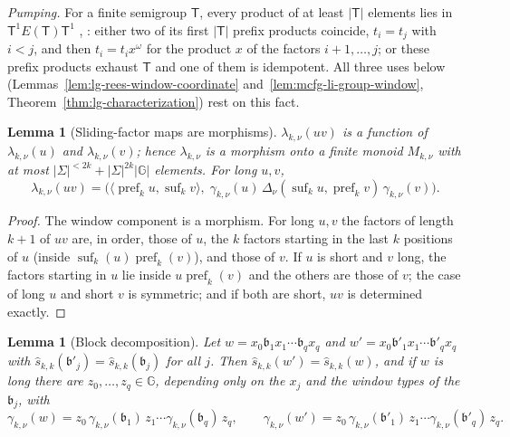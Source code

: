 \documentclass[11pt]{article}
\numberwithin{equation}{section}
\theoremstyle{plain}
\newtheorem{lemma}[theorem]{Lemma}
\theoremstyle{definition}
\theoremstyle{remark}
\theoremstyle{plain}
\begin{document}
\emph{Pumping.}  For a finite semigroup $\mathsf T$, every product of at least
$|\mathsf T|$ elements lies in $\mathsf T^1E(\mathsf T)\mathsf T^1$
\cite[Lemma~2.2]{AlmeidaEtAl2009}, \cite{Pin1986}: either two of its first
$|\mathsf T|$ prefix products coincide, $t_i=t_j$ with $i<j$, and then
$t_i=t_ix^\omega$ for the product $x$ of the factors $i+1,\ldots,j$; or these prefix
products exhaust $\mathsf T$ and one of them is idempotent.  All three uses below
(Lemmas~\ref{lem:lg-rees-window-coordinate} and~\ref{lem:mcfg-li-group-window},
Theorem~\ref{thm:lg-characterization}) rest on this fact.

\begin{lemma}[Sliding-factor maps are morphisms]
\label{lem:local-group-morphism}
$\lambda_{k,\nu}(uv)$ is a function of $\lambda_{k,\nu}(u)$ and $\lambda_{k,\nu}(v)$;
hence $\lambda_{k,\nu}$ is a morphism onto a finite monoid $M_{k,\nu}$ with at most
$|\Sigma|^{<2k}+|\Sigma|^{2k}|{\mathbb G}|$ elements.  For long $u,v$,
\[
 \lambda_{k,\nu}(uv)
 =\bigl(\langle\operatorname{pref}_ku,\operatorname{suf}_kv\rangle,\;
   \gamma_{k,\nu}(u)\,\Delta_\nu(\operatorname{suf}_ku,\operatorname{pref}_kv)\,
   \gamma_{k,\nu}(v)\bigr).
\]
\end{lemma}

\begin{proof}
The window component is a morphism.  For long $u,v$ the factors of length $k+1$
of $uv$ are, in order, those of $u$, the $k$ factors starting in the last $k$
positions of $u$ (inside $\operatorname{suf}_k(u)\operatorname{pref}_k(v)$), and
those of $v$.  If $u$ is short and $v$ long, the factors starting in $u$ lie inside
$u\operatorname{pref}_k(v)$ and the others are those of $v$; the case of long $u$ and
short $v$ is symmetric; and if both are short, $uv$ is determined exactly.
\end{proof}

\begin{lemma}[Block decomposition]
\label{lem:local-group-blocks}
Let $w=x_0\mathfrak b_1x_1\cdots\mathfrak b_qx_q$ and $w'=x_0\mathfrak b'_1x_1\cdots\mathfrak b'_qx_q$ with
$\widehat s_{k,k}(\mathfrak b'_j)=\widehat s_{k,k}(\mathfrak b_j)$ for all $j$.  Then
$\widehat s_{k,k}(w')=\widehat s_{k,k}(w)$, and if $w$ is long there are
$z_0,\ldots,z_q\in {\mathbb G}$, depending only on the $x_j$ and the window types of the
$\mathfrak b_j$, with
\[
 \gamma_{k,\nu}(w)=z_0\,\gamma_{k,\nu}(\mathfrak b_1)\,z_1\cdots\gamma_{k,\nu}(\mathfrak b_q)\,z_q,
 \qquad
 \gamma_{k,\nu}(w')=z_0\,\gamma_{k,\nu}(\mathfrak b'_1)\,z_1\cdots\gamma_{k,\nu}(\mathfrak b'_q)\,z_q .
\]
\end{lemma}
\end{document}
